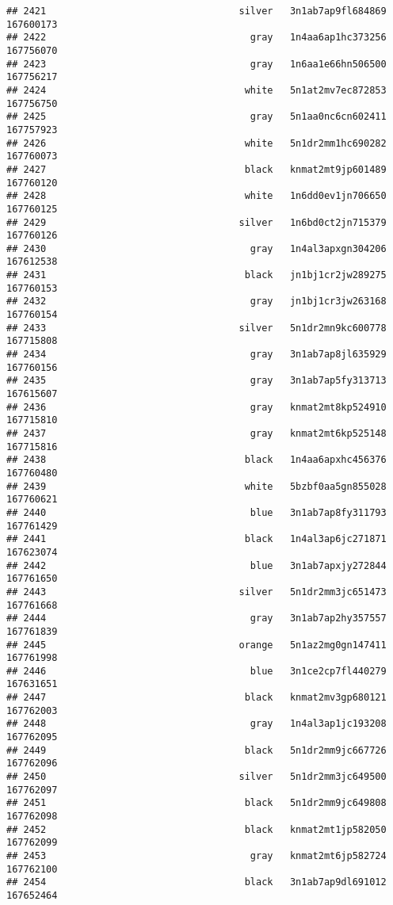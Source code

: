 \documentclass[
]{article}
\begin{document}
\begin{verbatim}
## 2421                                  silver   3n1ab7ap9fl684869 167600173
## 2422                                    gray   1n4aa6ap1hc373256 167756070
## 2423                                    gray   1n6aa1e66hn506500 167756217
## 2424                                   white   5n1at2mv7ec872853 167756750
## 2425                                    gray   5n1aa0nc6cn602411 167757923
## 2426                                   white   5n1dr2mm1hc690282 167760073
## 2427                                   black   knmat2mt9jp601489 167760120
## 2428                                   white   1n6dd0ev1jn706650 167760125
## 2429                                  silver   1n6bd0ct2jn715379 167760126
## 2430                                    gray   1n4al3apxgn304206 167612538
## 2431                                   black   jn1bj1cr2jw289275 167760153
## 2432                                    gray   jn1bj1cr3jw263168 167760154
## 2433                                  silver   5n1dr2mn9kc600778 167715808
## 2434                                    gray   3n1ab7ap8jl635929 167760156
## 2435                                    gray   3n1ab7ap5fy313713 167615607
## 2436                                    gray   knmat2mt8kp524910 167715810
## 2437                                    gray   knmat2mt6kp525148 167715816
## 2438                                   black   1n4aa6apxhc456376 167760480
## 2439                                   white   5bzbf0aa5gn855028 167760621
## 2440                                    blue   3n1ab7ap8fy311793 167761429
## 2441                                   black   1n4al3ap6jc271871 167623074
## 2442                                    blue   3n1ab7apxjy272844 167761650
## 2443                                  silver   5n1dr2mm3jc651473 167761668
## 2444                                    gray   3n1ab7ap2hy357557 167761839
## 2445                                  orange   5n1az2mg0gn147411 167761998
## 2446                                    blue   3n1ce2cp7fl440279 167631651
## 2447                                   black   knmat2mv3gp680121 167762003
## 2448                                    gray   1n4al3ap1jc193208 167762095
## 2449                                   black   5n1dr2mm9jc667726 167762096
## 2450                                  silver   5n1dr2mm3jc649500 167762097
## 2451                                   black   5n1dr2mm9jc649808 167762098
## 2452                                   black   knmat2mt1jp582050 167762099
## 2453                                    gray   knmat2mt6jp582724 167762100
## 2454                                   black   3n1ab7ap9dl691012 167652464

\end{verbatim}
\end{document}
